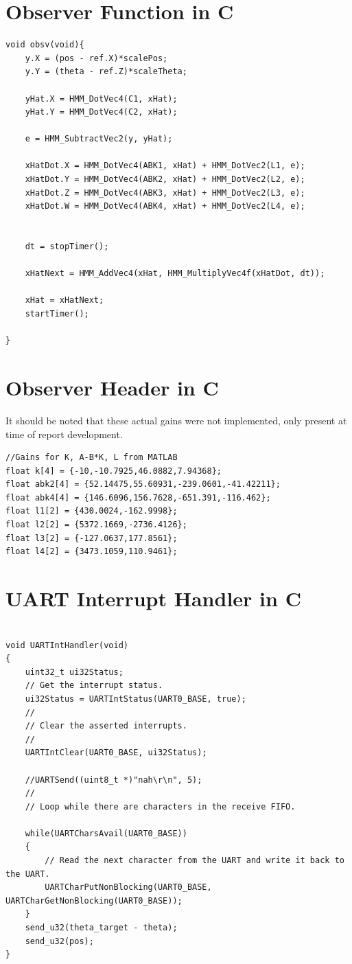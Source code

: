 \documentclass[12pt]{article}
\begin{document}
\section{Observer Function in C}
\label{obsverver}
\begin{verbatim}
void obsv(void){
    y.X = (pos - ref.X)*scalePos;
    y.Y = (theta - ref.Z)*scaleTheta;

    yHat.X = HMM_DotVec4(C1, xHat);
    yHat.Y = HMM_DotVec4(C2, xHat);

    e = HMM_SubtractVec2(y, yHat);

    xHatDot.X = HMM_DotVec4(ABK1, xHat) + HMM_DotVec2(L1, e);
    xHatDot.Y = HMM_DotVec4(ABK2, xHat) + HMM_DotVec2(L2, e);
    xHatDot.Z = HMM_DotVec4(ABK3, xHat) + HMM_DotVec2(L3, e);
    xHatDot.W = HMM_DotVec4(ABK4, xHat) + HMM_DotVec2(L4, e);


    dt = stopTimer();

    xHatNext = HMM_AddVec4(xHat, HMM_MultiplyVec4f(xHatDot, dt));

    xHat = xHatNext;
    startTimer();

}
\end{verbatim}

\section{Observer Header in C}
\label{obsvh}
It should be noted that these actual gains were not implemented, only present at time of report development.
\begin{verbatim}
//Gains for K, A-B*K, L from MATLAB
float k[4] = {-10,-10.7925,46.0882,7.94368};
float abk2[4] = {52.14475,55.60931,-239.0601,-41.42211};
float abk4[4] = {146.6096,156.7628,-651.391,-116.462};
float l1[2] = {430.0024,-162.9998};
float l2[2] = {5372.1669,-2736.4126};
float l3[2] = {-127.0637,177.8561};
float l4[2] = {3473.1059,110.9461};

\end{verbatim}

\section{UART Interrupt Handler in C}
\label{uart}
\begin{verbatim}

void UARTIntHandler(void)
{
    uint32_t ui32Status;
    // Get the interrupt status.
    ui32Status = UARTIntStatus(UART0_BASE, true);
    //
    // Clear the asserted interrupts.
    //
    UARTIntClear(UART0_BASE, ui32Status);

    //UARTSend((uint8_t *)"nah\r\n", 5);
    //
    // Loop while there are characters in the receive FIFO.
    
    while(UARTCharsAvail(UART0_BASE))
    {
        // Read the next character from the UART and write it back to the UART.
        UARTCharPutNonBlocking(UART0_BASE, UARTCharGetNonBlocking(UART0_BASE));
    }
    send_u32(theta_target - theta);
    send_u32(pos);
}
\end{verbatim}
\end{document}
